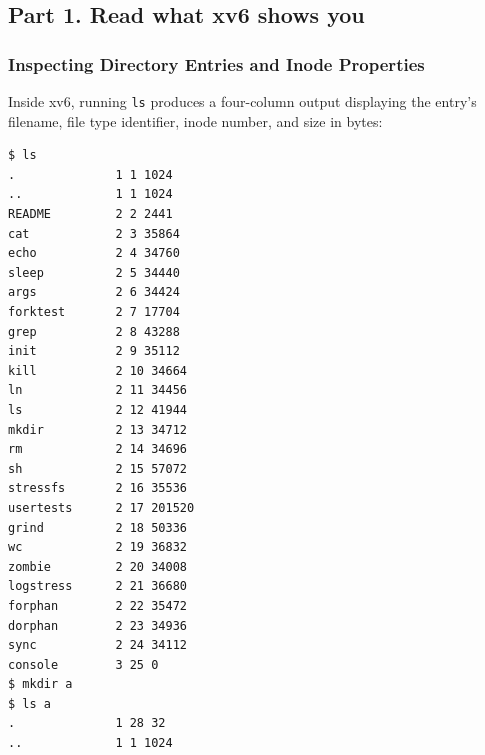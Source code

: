 \documentclass{labreport}
\begin{document}
\subsection{Part 1. Read what xv6 shows you}

\subsubsection{Inspecting Directory Entries and Inode Properties}
Inside xv6, running \texttt{ls} produces a four-column output displaying the entry's filename, file type identifier, inode number, and size in bytes:

\begin{lstlisting}[style=bash]
$ ls
.              1 1 1024
..             1 1 1024
README         2 2 2441
cat            2 3 35864
echo           2 4 34760
sleep          2 5 34440
args           2 6 34424
forktest       2 7 17704
grep           2 8 43288
init           2 9 35112
kill           2 10 34664
ln             2 11 34456
ls             2 12 41944
mkdir          2 13 34712
rm             2 14 34696
sh             2 15 57072
stressfs       2 16 35536
usertests      2 17 201520
grind          2 18 50336
wc             2 19 36832
zombie         2 20 34008
logstress      2 21 36680
forphan        2 22 35472
dorphan        2 23 34936
sync           2 24 34112
console        3 25 0
$ mkdir a
$ ls a
.              1 28 32
..             1 1 1024
\end{lstlisting}
\end{document}

